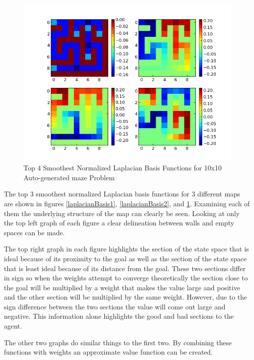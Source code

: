 \documentclass[12pt, letterpaper, final]{report}
\begin{document}
\FloatBarrier
\begin{figure}[h!]
\centering
\includegraphics[scale=.5]{images/maze01_laplacian_graph.png}
\caption{Top 4 Smoothest Normalized Laplacian Basis Functions for
  10x10 Auto-generated maze Problem}
\label{laplacianBasis3}
\end{figure}
\FloatBarrier

The top 3 smoothest normalized Laplacian basis functions for 3
different maps are shown in figures \ref{laplacianBasis1},
\ref{laplacianBasis2}, and \ref{laplacianBasis3}. Examining each of
them the underlying structure of the map can clearly be seen. Looking
at only the top left graph of each figure a clear delineation between
walls and empty spaces can be made. 

The top right graph in each figure
highlights the section of the state space that is ideal because of its
proximity to the goal as well as the section of the state space that
is least ideal because of its distance from the goal. These two
sections differ in sign so when the weights attempt to converge
theoretically the section close to the goal will be multiplied by a
weight that makes the value large and positive and the other section
will be multiplied by the same weight. However, due to the sign
difference between the two sections the value will come out large and
negative. This information alone highlights the good and bad sections
to the agent.

The other two graphs do similar things to the first two. By combining
these functions with weights an approximate value function can be created.
\end{document}
